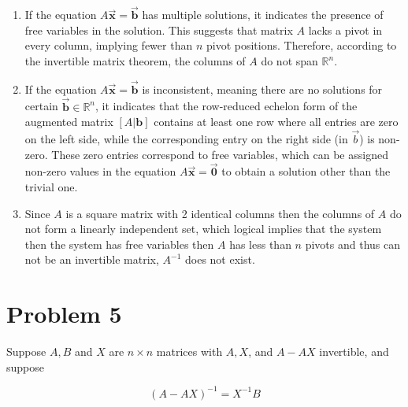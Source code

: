 \documentclass[letter,11pt]{article}
\begin{document}
\begin{tcolorbox}[boxrule=1mm, width=(.9\linewidth),before=\hfill,after=\hfill,adjusted title={Problem 4 Solutions}]
    \begin{enumerate}[label = \roman*.]
        \item If the equation $A \vec{\boldsymbol{x}}=\vec{\boldsymbol{b}}$ has multiple solutions, it indicates the presence of free variables in the solution. This suggests that matrix $A$ lacks a pivot in every column, implying fewer than $n$ pivot positions. Therefore, according to the invertible matrix theorem, the columns of $A$ do not span $\mathbb{R}^n$.
        
        \item If the equation $A\vec{\boldsymbol{x}}=\vec{\boldsymbol{b}}$ is inconsistent, meaning there are no solutions for certain $\vec{\boldsymbol{b}} \in \mathbb{R}^n$, it indicates that the row-reduced echelon form of the augmented matrix $[A | {\boldsymbol{b}}]$ contains at least one row where all entries are zero on the left side, while the corresponding entry on the right side (in $\vec{b}$) is non-zero. These zero entries correspond to free variables, which can be assigned non-zero values in the equation $A \vec{\boldsymbol{x}} = \vec{\boldsymbol{0}}$ to obtain a solution other than the trivial one. 
        
        \item Since $A$ is a square matrix with 2 identical columns then the columns of $A$ do not form a linearly independent set, which logical implies that the system then the system has free variables then $A$ has less than $n$ pivots and thus can not be an invertible matrix, $A^{-1}$ does not exist.
    \end{enumerate}
\end{tcolorbox}
\newpage

\section{Problem 5}
Suppose $A, B$ and $X$ are $n \times n$ matrices with $A, X$, and $A-A X$ invertible, and suppose

$$(A-A X)^{-1}=X^{-1} B$$
\end{document}

